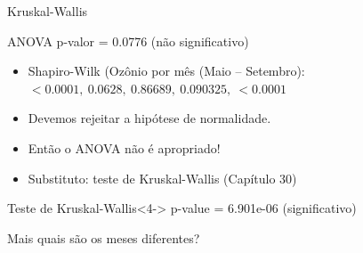 \documentclass{beamer}
\begin{document}
\begin{frame}{Kruskal-Wallis}
  \begin{exampleblock}{ANOVA}
    \small
    p-valor = 0.0776 (não significativo)
  \end{exampleblock}
  \begin{itemize}
    \footnotesize
  \item<2-> Shapiro-Wilk (Ozônio por mês (Maio -- Setembro): {\scriptsize $< 0.0001,\ 0.0628,\ 0.86689,\ 0.090325,\ < 0.0001$}
    \bigskip
  \item<3-> Devemos rejeitar a hipótese de normalidade.
  \item<3-> Então o ANOVA \alert{não é} apropriado!
  \item<3-> Substituto: teste de Kruskal-Wallis (Capítulo 30)
  \end{itemize}
  \bigskip
  \begin{exampleblock}{Teste de Kruskal-Wallis}<4->
    \small
    p-value = \alert{6.901e-06} (significativo)
  \end{exampleblock}
\end{frame}

\begin{frame}
  \begin{center}
    Mais quais são os meses diferentes?
  \end{center}
\end{frame}
\end{document}
